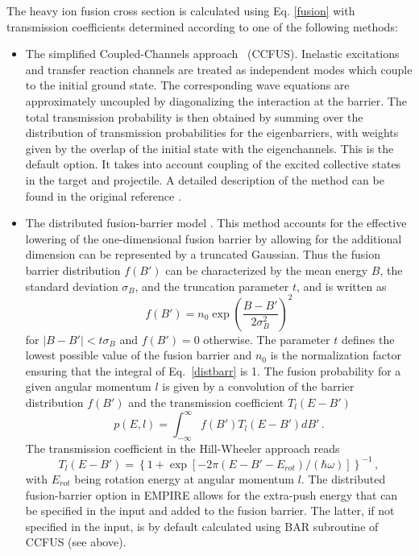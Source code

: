 \documentclass[twocolumn,amsmath,amssymb,10pt,groupedaddress,a4paper]{revtex4}
\begin{document}
The heavy ion fusion cross section is calculated using Eq. \ref{fusion}
with transmission coefficients determined according to one of the
following methods:

\begin{itemize}
\item The simplified Coupled-Channels approach~\cite{CCFUS} (CCFUS). Inelastic
excitations and transfer reaction channels are treated as independent
modes which couple to the initial ground state. The corresponding
wave equations are approximately uncoupled by diagonalizing the interaction
at the barrier. The total transmission probability is then obtained
by summing over the distribution of transmission probabilities for
the eigenbarriers, with weights given by the overlap of the initial
state with the eigenchannels. This is the default option. It takes into
account coupling of the excited collective states in the target and
projectile. A detailed description of the method can be found in the
original reference \cite{CCFUS}.
\item The distributed fusion-barrier
model \cite{difusb}. This method accounts for the effective lowering
of the one-dimensional fusion barrier by allowing for the additional
dimension can be represented by a truncated Gaussian. Thus the fusion
barrier distribution $f(B')$ can be characterized by the mean energy
$B$, the standard deviation $\sigma_{B}$, and the truncation parameter
$t$, and is written as
\begin{equation}
f(B')=n_{0}\exp\left(\frac{B-B'}{2\sigma_{B}^{2}}\right)^{2} \label{distbarr}
\end{equation}
\noindent for $\left|B-B'\right|<t\sigma_{B}$ and $f(B')=0$ otherwise. The
parameter $t$ defines the lowest possible value of the fusion barrier
and $n_{0}$ is the normalization factor ensuring that the integral
of Eq.~\ref{distbarr} is 1. The fusion probability for a given angular
momentum $l$ is given by a convolution of the barrier distribution
$f(B')$ and the transmission coefficient $T_{l}(E-B')$
\begin{equation}
p(E,l)=\int_{-\infty}^{\infty}f(B')T_{l}(E-B')dB'\,.
\end{equation}
\noindent The transmission coefficient in the Hill-Wheeler
approach \cite{HillWheeler} reads
\begin{equation}
T_{l}(E-B')=\left\{ 1+\exp\left[-2\pi(E-B'-E_{rot})/(\hbar\omega)\right]\right\} ^{-1}\,,
\end{equation}
\noindent with $E_{rot}$ being rotation energy at angular momentum $l$. The
distributed fusion-barrier option
in EMPIRE allows for the extra-push energy that can be specified in
the input and added to the fusion barrier. The latter, if not specified
in the input, is by default calculated using BAR subroutine of CCFUS
(see above).


\end{itemize}
\end{document}
